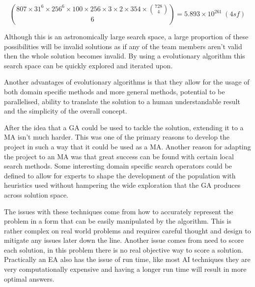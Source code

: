 \documentclass[a4paper]{article}
\begin{document}
\begin{equation}
    {807 \times 31^6 \times 256^6 \times 100 \times 256 \times 3 \times 2 \times 354 \times {728 \choose 4} \choose 6} = 5.893 \times 10^{261}\ (4sf)
\end{equation} %
\par
Although this is an astronomically large search space, a large proportion of these possibilities will be invalid solutions as if any of the team members aren't valid then the whole solution becomes invalid.
By using a evolutionary algorithm this search space can be quickly explored and iterated upon.
\par
Another advantages of evolutionary algorithms is that they allow for the usage of both domain specific methods and more general methods, potential to be parallelised, ability to translate the solution to a human understandable result and the simplicity of the overall concept.
\\ \par
After the idea that a GA could be used to tackle the solution, extending it to a MA isn't much harder.
This was one of the primary reasons to develop the project in such a way that it could be used as a MA\@.
Another reason for adapting the project to an MA was that great success can be found with certain local search methods.
Some interesting domain specific search operators could be defined to allow for experts to shape the development of the population with heuristics used without hampering the wide exploration that the GA produces across solution space.
\\ \par
The issues with these techniques come from how to accurately represent the problem in a form that can be easily manipulated by the algorithm.
This is rather complex on real world problems and requires careful thought and design to mitigate any issues later down the line.
Another issue comes from need to score each solution, in this problem there is no real objective way to score a solution.
Practically an EA also has the issue of run time, like most AI techniques they are very computationally expensive and having a longer run time will result in more optimal answers.
\\ \par
\end{document}
